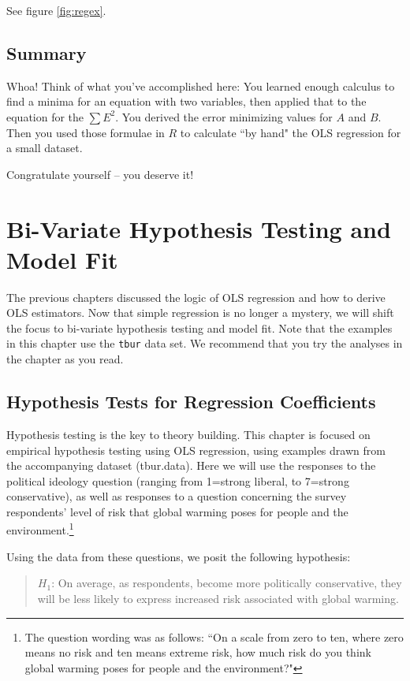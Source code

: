 \documentclass[11pt,openany]{book}\usepackage[]{graphicx}\usepackage[]{color}
\begin{document}
See figure \ref{fig:regex}.

\section{Summary}
Whoa! Think of what you've accomplished here: You learned enough calculus to find a minima for an equation with two variables, then applied that to the equation for the $\sum E^{2}$. You derived the error minimizing values for $A$ and $B$. Then you used those formulae in $R$ to calculate ``by hand" the OLS regression for a small dataset. 

Congratulate yourself -- you deserve it!




\chapter{Bi-Variate Hypothesis Testing and Model Fit}

The previous chapters discussed the logic of OLS regression and how to derive OLS estimators. Now that simple regression is no longer a mystery, we will shift the focus to bi-variate hypothesis testing and model fit. Note that the examples in this chapter use the \texttt{tbur} data set.  We recommend that you try the analyses in the chapter as you read.

\section{Hypothesis Tests for Regression Coefficients}

Hypothesis testing is the key to theory building. This chapter is focused on empirical hypothesis testing using OLS regression, using examples drawn from the accompanying dataset (tbur.data). Here we will use the responses to the political ideology question  (ranging from 1=strong liberal, to 7=strong conservative), as well as responses to a question concerning the survey respondents' level of risk that global warming poses for people and the environment.\footnote{The question wording was as follows: ``On a scale from zero to ten, where zero
means no risk and ten means extreme risk, how much
risk do you think global warming poses for people
and the environment?"}

Using the data from these questions, we posit the following hypothesis:
\begin{quote}
$H_{1}$: On average, as respondents, become more politically conservative, they will be less likely to express increased risk associated with global warming.
\end{quote}
\end{document}

